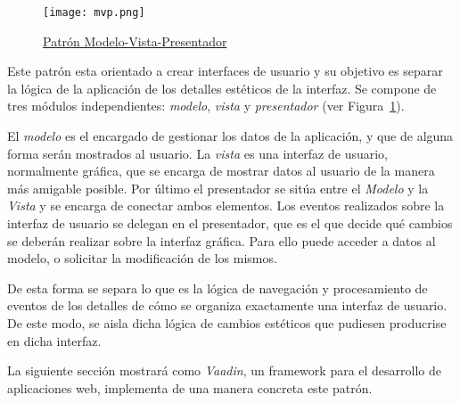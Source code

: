 \begin{figure}[H]
	\centering
	\texttt{[image: mvp.png]}
	\caption{\href{https://www.valmaraz.com/blog-42-modelo-vista-presentador-mvp-para-android-e-ios-desarrollo}{Patrón Modelo-Vista-Presentador}}\label{fig:mvp}
	
\end{figure}

Este patrón esta orientado a crear interfaces de usuario y su objetivo es separar la lógica de la aplicación de los detalles estéticos de la interfaz. Se compone de tres módulos independientes: \emph{modelo}, \emph{vista} y \emph{presentador} (ver Figura~\ref{fig:mvp}).



El \emph{modelo} es el encargado de gestionar los datos de la aplicación, y que de alguna forma serán mostrados al usuario. La \emph{vista} es una interfaz de usuario, normalmente gráfica, que se encarga de mostrar datos al usuario de la manera más amigable posible. Por último el presentador se sitúa entre el \emph{Modelo} y la \emph{Vista} y se encarga de conectar ambos elementos. Los eventos realizados sobre la interfaz de usuario se delegan en el presentador, que es el que decide qué cambios se deberán realizar sobre la interfaz gráfica. Para ello puede acceder a datos al modelo, o solicitar la modificación de los mismos. 

De esta forma se separa lo que es la lógica de navegación y procesamiento de eventos de los detalles de cómo se organiza exactamente una interfaz de usuario. De este modo, se aisla dicha lógica de cambios estéticos que pudiesen producrise en dicha interfaz. 

La siguiente sección mostrará como \emph{Vaadin}, un framework para el desarrollo de aplicaciones web, implementa de una manera concreta este patrón.

 


